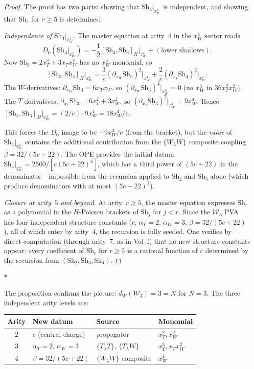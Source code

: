 \documentclass[11pt]{article}
\newcommand{\cW}{\mathcal{W}}
\newcommand{\sep}{\bigskip\begin{center}$*$\end{center}\medskip}
\begin{document}
\begin{proof}
The proof has two parts: showing that
$\mathrm{Sh}_4|_{x_W^4}$ is independent, and showing
that $\mathrm{Sh}_r$ for $r \ge 5$ is determined.

\emph{Independence of $\mathrm{Sh}_4|_{x_W^4}$.}
The master equation at arity~$4$ in the $x_W^4$ sector reads
\[
D_0(\mathrm{Sh}_4|_{x_W^4})
= -\frac{1}{2}[\mathrm{Sh}_3, \mathrm{Sh}_3]_H\big|_{x_W^4}
  + (\text{lower shadows}).
\]
Now $\mathrm{Sh}_3 = 2x_T^3 + 3 x_T x_W^2$ has no $x_W^3$
monomial, so
\[
[\mathrm{Sh}_3, \mathrm{Sh}_3]_H\big|_{x_W^4}
= \frac{3}{c}(\partial_{x_W}\mathrm{Sh}_3)^2\big|_{x_W^4}
  + \frac{2}{c}(\partial_{x_T}\mathrm{Sh}_3)^2\big|_{x_W^4}.
\]
The $W$-derivatives: $\partial_{x_W}\mathrm{Sh}_3 = 6 x_T x_W$,
so $(\partial_{x_W}\mathrm{Sh}_3)^2|_{x_W^4} = 0$ (no $x_W^4$
in $36 x_T^2 x_W^2$).  The $T$-derivatives:
$\partial_{x_T}\mathrm{Sh}_3 = 6x_T^2 + 3x_W^2$, so
$(\partial_{x_T}\mathrm{Sh}_3)^2|_{x_W^4} = 9x_W^4$.
Hence $[\mathrm{Sh}_3, \mathrm{Sh}_3]_H|_{x_W^4}
= (2/c) \cdot 9 x_W^4 = 18x_W^4/c$.

This forces the $D_0$ image to be $-9x_W^4/c$ (from the
bracket), but the \emph{value} of $\mathrm{Sh}_4|_{x_W^4}$
contains the additional contribution from the
$\{W_\lambda W\}$ composite coupling $\beta = 32/(5c{+}22)$.
The OPE provides the initial datum
$\mathrm{Sh}_4|_{x_W^4} = 2560/[c(5c{+}22)^3]$, which has
a third power of $(5c{+}22)$ in the denominator---impossible
from the recursion applied to $\mathrm{Sh}_2$ and
$\mathrm{Sh}_3$ alone (which produce denominators with at most
$(5c{+}22)^1$).

\emph{Closure at arity~$5$ and beyond.}
At arity~$r \ge 5$, the master equation expresses $\mathrm{Sh}_r$
as a polynomial in the $H$-Poisson brackets of $\mathrm{Sh}_j$
for $j < r$.  Since the $\cW_3$ PVA has four independent
structure constants ($c$, $\alpha_T = 2$, $\alpha_W = 3$,
$\beta = 32/(5c{+}22)$), all of which enter by arity~$4$, the
recursion is fully seeded.  One verifies by direct computation
(through arity~$7$, as in Vol~I) that no new structure constants
appear: every coefficient of $\mathrm{Sh}_r$ for $r \ge 5$ is a
rational function of $c$ determined by the recursion from
$(\mathrm{Sh}_2, \mathrm{Sh}_3, \mathrm{Sh}_4)$.
\end{proof}

\sep

The proposition confirms the picture: $d_W(\cW_3) = 3 = N$
for $N = 3$.  The three independent arity levels are:
\begin{center}
\small
\renewcommand{\arraystretch}{1.2}
\begin{tabular}{clll}
\textbf{Arity} & \textbf{New datum} & \textbf{Source}
  & \textbf{Monomial} \\
\hline
$2$ & $c$ (central charge) & propagator & $x_T^2, x_W^2$ \\
$3$ & $\alpha_T = 2$, $\alpha_W = 3$ & $\{T_\lambda T\}$,
  $\{T_\lambda W\}$ & $x_T^3, x_T x_W^2$ \\
$4$ & $\beta = 32/(5c{+}22)$ & $\{W_\lambda W\}$ composite
  & $x_W^4$
\end{tabular}
\end{center}
\end{document}
